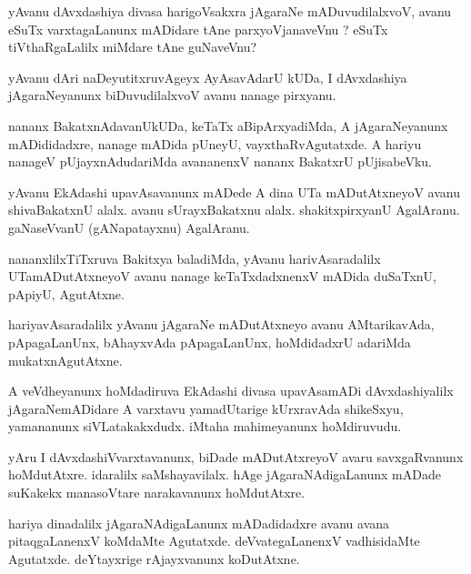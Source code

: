 \documentclass{article}
\begin{document}
\begin{mn}%
yAvanu dAvxdashiya divasa harigoVsakxra jAgaraNe mADuvudilalxvoV, avanu eSuTx varxtagaLanunx 
mADidare tAne parxyoVjanaveVnu ? eSuTx tiVthaRgaLalilx miMdare tAne guNaveVnu?
\end{mn}

\begin{mn}%
yAvanu dAri naDeyutitxruvAgeyx AyAsavAdarU kUDa, I dAvxdashiya jAgaraNeyanunx biDuvudilalxvoV avanu 
nanage pirxyanu.
\end{mn}

\begin{mn}%
nananx BakatxnAdavanUkUDa, keTaTx aBipArxyadiMda, A jAgaraNeyanunx mADididadxre, nanage mADida 
pUneyU, vayxthaRvAgutatxde. A hariyu nanageV pUjayxnAdudariMda avananenxV nananx BakatxrU 
pUjisabeVku.
\end{mn}

\begin{mn}%
yAvanu EkAdashi upavAsavanunx mADede A dina UTa mADutAtxneyoV avanu shivaBakatxnU alalx. avanu 
sUrayxBakatxnu alalx. shakitxpirxyanU AgalAranu. gaNaseVvanU (gANapatayxnu) AgalAranu.
\end{mn}

\begin{mn}%
nananxlilxTiTxruva Bakitxya baladiMda, yAvanu harivAsaradalilx UTamADutAtxneyoV avanu nanage 
keTaTxdadxnenxV mADida duSaTxnU, pApiyU, AgutAtxne.
\end{mn}

\begin{mn}%
hariyavAsaradalilx yAvanu jAgaraNe mADutAtxneyo avanu AMtarikavAda, pApagaLanUnx, bAhayxvAda 
pApagaLanUnx, hoMdidadxrU adariMda mukatxnAgutAtxne.
\end{mn}

\begin{mn}%
A veVdheyanunx hoMdadiruva EkAdashi divasa upavAsamADi dAvxdashiyalilx jAgaraNemADidare A varxtavu 
yamadUtarige kUrxravAda shikeSxyu, yamananunx siVLatakakxdudx. iMtaha mahimeyanunx hoMdiruvudu.
\end{mn}

\begin{mn}%
yAru I dAvxdashiVvarxtavanunx, biDade mADutAtxreyoV avaru savxgaRvanunx hoMdutAtxre. idaralilx 
saMshayavilalx. hAge jAgaraNAdigaLanunx mADade suKakekx manasoVtare narakavanunx hoMdutAtxre.
\end{mn}

\begin{mn}%
hariya dinadalilx jAgaraNAdigaLanunx mADadidadxre avanu avana pitaqgaLanenxV koMdaMte Agutatxde. 
deVvategaLanenxV vadhisidaMte Agutatxde. deYtayxrige rAjayxvanunx koDutAtxne.
\end{mn}
\end{document}
